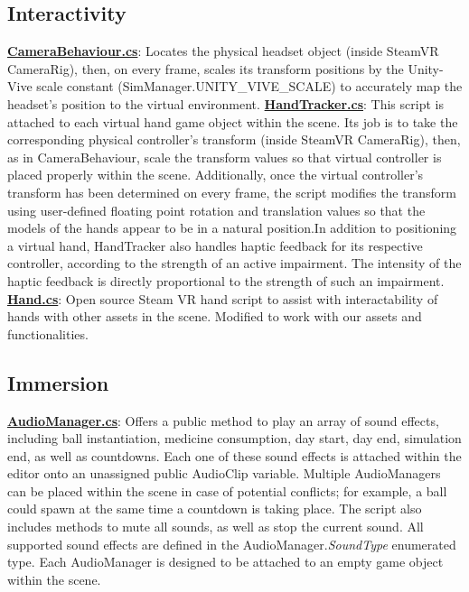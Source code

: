 \documentclass{article}
\begin{document}
\subsection{Interactivity} 
\href{https://bit.ly/2JH9ws0}{\textbf{CameraBehaviour.cs}}: Locates the physical headset object (inside SteamVR CameraRig), then, on every frame, scales its transform positions by the Unity-Vive scale constant (SimManager.UNITY\_VIVE\_SCALE) to accurately map the headset's position to the virtual environment. \newline \newline
\href{https://bit.ly/2U3xT7n}{\textbf{HandTracker.cs}}: This script is attached to each virtual hand game object within the scene. Its job is to take the corresponding physical controller's transform (inside SteamVR CameraRig), then, as in CameraBehaviour, scale the transform values so that virtual controller is placed properly within the scene. Additionally, once the virtual controller's transform has been determined on every frame, the script modifies the transform using user-defined floating point rotation and translation values so that the models of the hands appear to be in a natural position.\newline In addition to positioning a virtual hand, HandTracker also handles haptic feedback for its respective controller, according to the strength of an active impairment. The intensity of the haptic feedback is directly proportional to the strength of such an impairment. \newline \newline
\href{https://bit.ly/2XLGcmi}{\textbf{Hand.cs}}: Open source Steam VR hand script to assist with interactability of hands with other assets in the scene. Modified to work with our assets and functionalities.


\subsection{Immersion} 
\href{https://bit.ly/2HHzDwj}{\textbf{AudioManager.cs}}: Offers a public method to play an array of sound effects, including ball instantiation, medicine consumption, day start, day end, simulation end, as well as countdowns. Each one of these sound effects is attached within the editor onto an unassigned public AudioClip variable. Multiple AudioManagers can be placed within the scene in case of potential conflicts; for example, a ball could spawn at the same time a countdown is taking place. The script also includes methods to mute all sounds, as well as stop the current sound. All supported sound effects are defined in the AudioManager.\textit{SoundType} enumerated type. Each AudioManager is designed to be attached to an empty game object within the scene.
\end{document}
